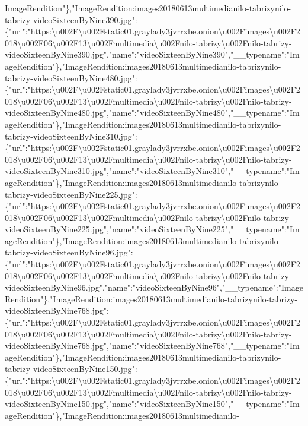 ImageRendition"\},"ImageRendition:images20180613multimedianilo-tabrizynilo-tabrizy-videoSixteenByNine390.jpg":\{"url":"https:\textbackslash{}u002F\textbackslash{}u002Fstatic01.graylady3jvrrxbe.onion\textbackslash{}u002Fimages\textbackslash{}u002F2018\textbackslash{}u002F06\textbackslash{}u002F13\textbackslash{}u002Fmultimedia\textbackslash{}u002Fnilo-tabrizy\textbackslash{}u002Fnilo-tabrizy-videoSixteenByNine390.jpg","name":"videoSixteenByNine390","\_\_typename":"ImageRendition"\},"ImageRendition:images20180613multimedianilo-tabrizynilo-tabrizy-videoSixteenByNine480.jpg":\{"url":"https:\textbackslash{}u002F\textbackslash{}u002Fstatic01.graylady3jvrrxbe.onion\textbackslash{}u002Fimages\textbackslash{}u002F2018\textbackslash{}u002F06\textbackslash{}u002F13\textbackslash{}u002Fmultimedia\textbackslash{}u002Fnilo-tabrizy\textbackslash{}u002Fnilo-tabrizy-videoSixteenByNine480.jpg","name":"videoSixteenByNine480","\_\_typename":"ImageRendition"\},"ImageRendition:images20180613multimedianilo-tabrizynilo-tabrizy-videoSixteenByNine310.jpg":\{"url":"https:\textbackslash{}u002F\textbackslash{}u002Fstatic01.graylady3jvrrxbe.onion\textbackslash{}u002Fimages\textbackslash{}u002F2018\textbackslash{}u002F06\textbackslash{}u002F13\textbackslash{}u002Fmultimedia\textbackslash{}u002Fnilo-tabrizy\textbackslash{}u002Fnilo-tabrizy-videoSixteenByNine310.jpg","name":"videoSixteenByNine310","\_\_typename":"ImageRendition"\},"ImageRendition:images20180613multimedianilo-tabrizynilo-tabrizy-videoSixteenByNine225.jpg":\{"url":"https:\textbackslash{}u002F\textbackslash{}u002Fstatic01.graylady3jvrrxbe.onion\textbackslash{}u002Fimages\textbackslash{}u002F2018\textbackslash{}u002F06\textbackslash{}u002F13\textbackslash{}u002Fmultimedia\textbackslash{}u002Fnilo-tabrizy\textbackslash{}u002Fnilo-tabrizy-videoSixteenByNine225.jpg","name":"videoSixteenByNine225","\_\_typename":"ImageRendition"\},"ImageRendition:images20180613multimedianilo-tabrizynilo-tabrizy-videoSixteenByNine96.jpg":\{"url":"https:\textbackslash{}u002F\textbackslash{}u002Fstatic01.graylady3jvrrxbe.onion\textbackslash{}u002Fimages\textbackslash{}u002F2018\textbackslash{}u002F06\textbackslash{}u002F13\textbackslash{}u002Fmultimedia\textbackslash{}u002Fnilo-tabrizy\textbackslash{}u002Fnilo-tabrizy-videoSixteenByNine96.jpg","name":"videoSixteenByNine96","\_\_typename":"ImageRendition"\},"ImageRendition:images20180613multimedianilo-tabrizynilo-tabrizy-videoSixteenByNine768.jpg":\{"url":"https:\textbackslash{}u002F\textbackslash{}u002Fstatic01.graylady3jvrrxbe.onion\textbackslash{}u002Fimages\textbackslash{}u002F2018\textbackslash{}u002F06\textbackslash{}u002F13\textbackslash{}u002Fmultimedia\textbackslash{}u002Fnilo-tabrizy\textbackslash{}u002Fnilo-tabrizy-videoSixteenByNine768.jpg","name":"videoSixteenByNine768","\_\_typename":"ImageRendition"\},"ImageRendition:images20180613multimedianilo-tabrizynilo-tabrizy-videoSixteenByNine150.jpg":\{"url":"https:\textbackslash{}u002F\textbackslash{}u002Fstatic01.graylady3jvrrxbe.onion\textbackslash{}u002Fimages\textbackslash{}u002F2018\textbackslash{}u002F06\textbackslash{}u002F13\textbackslash{}u002Fmultimedia\textbackslash{}u002Fnilo-tabrizy\textbackslash{}u002Fnilo-tabrizy-videoSixteenByNine150.jpg","name":"videoSixteenByNine150","\_\_typename":"ImageRendition"\},"ImageRendition:images20180613multimedianilo-